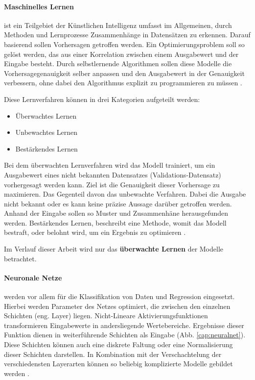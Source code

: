 \paragraph{Maschinelles Lernen} ist ein Teilgebiet der Künstlichen Intelligenz umfasst im Allgemeinen, durch Methoden und Lernprozesse Zusammenhänge in Datensätzen zu erkennen. Darauf basierend sollen Vorhersagen getroffen werden. Ein Optimierungsproblem soll so gelöst werden, das aus einer Korrelation zwischen einem Ausgabewert und der Eingabe besteht. Durch selbstlernende Algorithmen sollen diese Modelle die Vorhersagegenauigkeit selber anpassen und den Ausgabewert in der Genauigkeit verbessern, ohne dabei den Algorithmus explizit zu programmieren zu müssen \cite{machinelearning_1} \cite{machinelearning_2}.

Diese  Lernverfahren können in drei Kategorien aufgeteilt werden:
\begin{itemize}
  \setlength\itemsep{-0.5em}
\item Überwachtes Lernen
\item Unbewachtes Lernen
\item Bestärkendes Lernen
\end{itemize}

Bei dem überwachten Lernverfahren wird das Modell trainiert, um ein Ausgabewert eines nicht bekannten Datensatzes (Validations-Datensatz) vorhergesagt werden kann. Ziel ist die Genauigkeit dieser Vorhersage zu maximieren. Das Gegenteil davon das unbewachte Verfahren. Dabei die Ausgabe nicht bekannt oder es kann keine präzise Aussage darüber getroffen werden. Anhand der Eingabe sollen so Muster und Zusammenhäne herausgefunden werden. Bestärkendes Lernen, beschreibt eine Methode, womit das Modell bestraft, oder belohnt wird, um ein Ergebnis zu optimieren \cite{machinelearning_1}.

Im Verlauf dieser Arbeit wird nur das \textbf{überwachte Lernen} der Modelle betrachtet.


\paragraph{Neuronale Netze} werden vor allem für die Klassifikation von Daten und Regression eingesetzt. Hierbei werden Parameter des Netzes optimiert, die zwischen den einzelnen Schichten (eng. Layer) liegen. Nicht-Lineare Aktivierungsfunktionen transformieren Eingabewerte in andersliegende Wertebereiche. Ergebnisse dieser Funktion dienen in weiterführende Schichten als Eingabe (Abb. \ref{cap:neuralnet}). Diese Schichten können auch eine diskrete Faltung oder eine Normalisierung dieser Schichten darstellen. In Kombination mit der Verschachtelung der verschiedensten Layerarten können so beliebig komplizierte Modelle gebildet werden \cite{machinelearning_3}.


